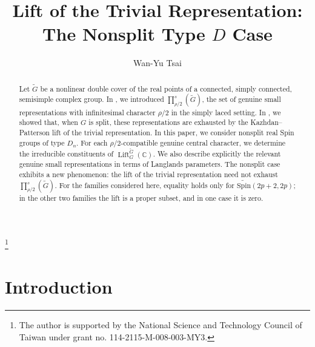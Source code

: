 \documentclass{amsart}
\DeclareMathOperator{\Lift}{Lift}
\newcommand{\bbC}{{\mathbb{C}}}
\newcommand{\Spin}{{\mathrm{Spin}}}
\theoremstyle{definition}
\newcommand{\tu}{\widetilde}
\begin{document}

\title{Lift of the Trivial Representation:\\ The Nonsplit Type $D$ Case}

\author{Wan-Yu Tsai}

 \thanks{The author is supported by the National Science and Technology Council of Taiwan under grant no. 114-2115-M-008-003-MY3.}





\begin{abstract}


Let $\widetilde G$ be a nonlinear double cover of the real points of a
connected, simply connected, semisimple complex group.
In \cite{Ts19}, we introduced
$\prod_{\rho/2}^s(\tu G)$, the set of genuine small representations
with infinitesimal character $\rho/2$ in the simply laced setting.
In \cite{Ts23}, we showed that, when $G$ is split, these representations
are exhausted by the Kazhdan--Patterson lift of the trivial representation.  In this paper, we consider nonsplit real Spin groups of type $D_n$. For each
$\rho/2$-compatible genuine central character, we determine the irreducible
constituents of
$\Lift_G^{\widetilde G}(\bbC)$.
We also describe explicitly the relevant genuine small representations in terms
of Langlands parameters. The nonsplit case exhibits a new phenomenon: the lift
of the trivial representation need not exhaust
$\prod\nolimits^s_{\rho/2}(\widetilde G).
$ 
For the families considered here, equality holds only for
\(\widetilde{\Spin}(2p+2,2p)\); in the other two families the lift is a proper
subset, and in one case it is zero.

\end{abstract}




\maketitle



\section{Introduction}
\end{document}
